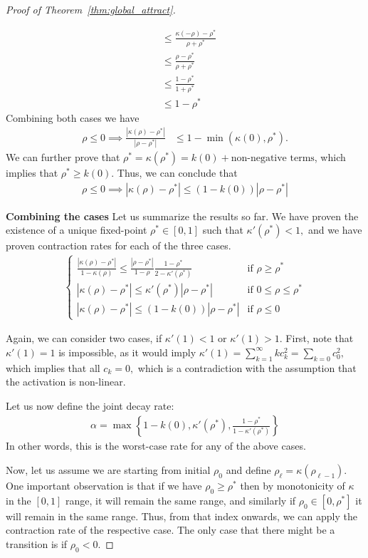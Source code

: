 \documentclass[twoside]{article}
\theoremstyle{definition}
\begin{document}
\begin{proof}[Proof of Theorem~\ref{thm:global_attract}]
\begin{itemize}
\begin{align*}
&\le \frac{\kappa(-\rho)-\rho^*}{\rho+\rho^*} \\
&\le \frac{\rho-\rho^*}{\rho+\rho^*} \\
&\le \frac{1-\rho^*}{1+\rho^*} \\
&\le 1-\rho^*
\end{align*} 
Combining both cases we have 
\begin{align*}
\rho \le 0 \implies \frac{|\kappa(\rho)-\rho^*|}{|\rho-\rho^*|} &\le 1-\min(\kappa(0),\rho^*).
\end{align*}
We can further prove that $\rho^* = \kappa(\rho^*) = k(0) + \text{non-negative terms}$, which implies that $\rho^* \ge k(0)$. Thus, we can conclude that 
\begin{align*}
\rho \le 0 \implies |\kappa(\rho)-\rho^*| \le (1 - k(0))|\rho-\rho^*|
\end{align*}
\end{itemize}



\textbf{Combining the cases}
Let us summarize the results so far. We have proven the existence of a unique fixed-point $\rho^*\in[0,1]$ such that $\kappa'(\rho^*)< 1,$ and we have proven contraction rates for each of the three cases.
\begin{align*}
\begin{cases}
\frac{|\kappa(\rho)-\rho^*|}{1-\kappa(\rho)} \le \frac{|\rho-\rho^*|}{1-\rho}\frac{1-\rho^*}{2-\kappa'(\rho^*)} & \text{if } \rho \ge \rho^* \\
|\kappa(\rho)-\rho^*| \le \kappa'(\rho^*)|\rho-\rho^*| & \text{if } 0 \le \rho \le \rho^*\\
|\kappa(\rho)-\rho^*| \le (1 - k(0))|\rho-\rho^*| & \text{if } \rho \le 0 
\end{cases}
\end{align*}

Again, we can consider two cases, if $\kappa'(1)<1$ or $\kappa'(1)>1.$ First, note that $\kappa'(1)=1$ is impossible, as it would imply $\kappa'(1)=\sum_{k=1}^\infty k c_k^2 = \sum_{k=0}c_0^2 ,$ which implies that all $c_k=0,$ which is a contradiction with the assumption that the activation is non-linear.

Let us now define the joint decay rate:
\begin{align*}
\alpha = \max\left\{1 - k(0), \kappa'(\rho^*), \frac{1-\rho^*}{1-\kappa'(\rho^*)}\right\}
\end{align*}
In other words, this is the worst-case rate for any of the above cases. 

Now, let us assume we are starting from initial $\rho_0$ and define $\rho_\ell = \kappa(\rho_{\ell-1})$. One important observation is that if we have $\rho_0 \ge \rho^*$ then by monotonicity of $\kappa$ in the $[0,1]$ range, it will remain the same range, and similarly if $\rho_0\in[0,\rho^*]$ it will remain in the same range. Thus, from that index onwards, we can apply the contraction rate of the respective case. The only case that there might be a transition is if $\rho_0 < 0$. 


\end{proof}
\end{document}
